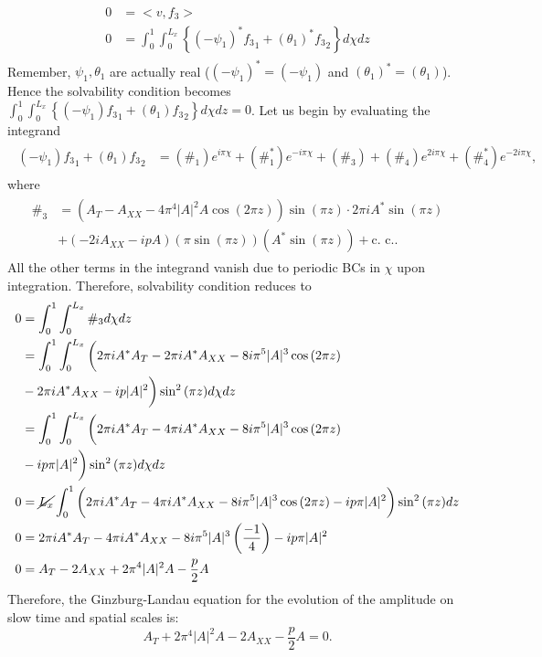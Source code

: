 \documentclass{article}
\begin{document}
\begin{align}
 \begin{split}
    0 &= <v, f_{3}> \\
    0 &= \int_{0}^{1}\int_{0}^{L_{x}} \left\{ (-\psi_{1})^{*}{f_{3}}_{1} + (\theta_{1})^{*}{f_{3}}_{2} \right\} d\chi dz
 \end{split}
\end{align}
Remember, $\psi_{1}, \theta_{1}$ are actually real ($(-\psi_{1})^{*} = (-\psi_{1})$ and $(\theta_{1})^{*} = (\theta_{1})$). Hence the solvability condition becomes $\int_{0}^{1}\int_{0}^{L_{x}} \left\{ (-\psi_{1}){f_{3}}_{1} + (\theta_{1}){f_{3}}_{2} \right\} d\chi dz = 0$. 
%
Let us begin by evaluating the integrand
\begin{align}
 \begin{split}
  (-\psi_{1}){f_{3}}_{1} + (\theta_{1}){f_{3}}_{2} &= (\#_{1}) e^{i \pi \chi} + (\#^{*}_{1}) e^{-i \pi \chi} + (\#_{3}) +  (\#_{4}) e^{2 i \pi \chi} + (\#^{*}_{4}) e^{-2 i \pi \chi},
 \end{split}
\end{align}
where 
\begin{align}
 \begin{split}
  \#_{3} &= (A_{T} - A_{XX} - 4 \pi^{4} |A|^{2}A \cos{(2 \pi z)})\sin{(\pi z)} \cdot 2 \pi i A^{*} \sin{(\pi z)} \\
  &+ (-2i A_{XX} - i p A)(\pi \sin{(\pi z)}) (A^{*} \sin{(\pi z)}) + \textrm{c. c.}.
 \end{split}
\end{align}
All the other terms in the integrand vanish due to periodic BCs in $\chi$ upon integration. Therefore, solvability condition reduces to 
\begin{align}
 \begin{split}
  0 &= \int_{0}^{1}\int_{0}^{L_{x}} \#_{3} d\chi dz \\
  &= \int_{0}^{1}\int_{0}^{L_{x}}  \bigg(2 \pi i A^{*} A_{T} - 2 \pi i A^{*} A_{XX} - 8i \pi^{5} |A|^{3} \cos{(2 \pi z)} \\
  &- 2 \pi i A^{*} A_{XX} - i p |A|^{2}\bigg)\sin^{2}{(\pi z)}  d\chi dz\\
  &= \int_{0}^{1}\int_{0}^{L_{x}}  \bigg(2 \pi i A^{*} A_{T} - 4 \pi i A^{*} A_{XX} - 8i \pi^{5} |A|^{3} \cos{(2 \pi z)} \\
  &- i p \pi |A|^{2}\bigg)\sin^{2}{(\pi z)}  d\chi dz \\
  0 &= \cancel{L_{x}} \int_{0}^{1} \bigg(2 \pi i A^{*} A_{T} - 4 \pi i A^{*} A_{XX} - 8i \pi^{5} |A|^{3} \cos{(2 \pi z)} - i p \pi |A|^{2}\bigg)\sin^{2}{(\pi z)}  dz \\
  0 &= 2 \pi i A^{*} A_{T}  - 4 \pi i A^{*} A_{XX}  - 8i \pi^{5}|A|^{3} \left(\frac{-1}{4}\right) - i p \pi |A|^{2}\\
  0 &= A_{T} - 2 A_{XX} + 2 \pi^{4}|A|^{2}A - \frac{p}{2} A
 \end{split}
\end{align}
Therefore, the Ginzburg-Landau equation for the evolution of the amplitude on slow time and spatial scales is:
\begin{equation}
 \boxed{A_{T} + 2\pi^{4} |A|^{2}A - 2 A_{XX} - \frac{p}{2} A = 0}. 
\end{equation}
\end{document}
